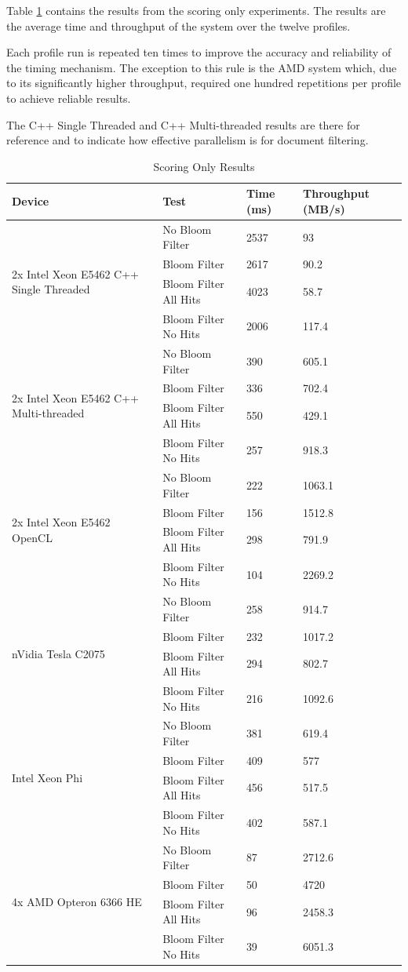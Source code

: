 Table \ref{table:scoringOnly} contains the results from the scoring only
experiments. The results are the average time and throughput of the system over
the twelve profiles.

Each profile run is repeated ten times to improve the accuracy and reliability
of the timing mechanism. The exception to this rule is the AMD system which,
due to its significantly higher throughput, required one hundred repetitions
per profile to achieve reliable results.

The C++ Single Threaded and C++ Multi-threaded results are there for reference
and to indicate how effective parallelism is for document filtering.

\begin{table}[H]
\begin{tabular}{|l|l|l|l|}
\hline
Device & Test & Time (ms) & Throughput (MB/s)\\
\hline
\multirow{4}{*}{2x Intel Xeon E5462 C++ Single Threaded}
& No Bloom Filter & 2537 & 93 \\
& Bloom Filter & 2617 & 90.2 \\
& Bloom Filter All Hits & 4023 & 58.7 \\
& Bloom Filter No Hits & 2006 & 117.4 \\
\hline
\multirow{4}{*}{2x Intel Xeon E5462 C++ Multi-threaded}
& No Bloom Filter & 390 & 605.1 \\
& Bloom Filter & 336 & 702.4 \\
& Bloom Filter All Hits & 550 & 429.1 \\
& Bloom Filter No Hits & 257 & 918.3 \\
\hline
\multirow{4}{*}{2x Intel Xeon E5462 OpenCL}
& No Bloom Filter & 222 & 1063.1 \\
& Bloom Filter & 156 & 1512.8 \\
& Bloom Filter All Hits & 298 & 791.9 \\
& Bloom Filter No Hits & 104 & 2269.2 \\
\hline
\multirow{4}{*}{nVidia Tesla C2075}
& No Bloom Filter & 258 & 914.7 \\
& Bloom Filter & 232 & 1017.2 \\
& Bloom Filter All Hits & 294 & 802.7 \\
& Bloom Filter No Hits & 216 & 1092.6 \\
\hline
\multirow{4}{*}{Intel Xeon Phi}
& No Bloom Filter & 381 & 619.4 \\
& Bloom Filter & 409 & 577 \\
& Bloom Filter All Hits & 456 & 517.5 \\
& Bloom Filter No Hits & 402 & 587.1 \\
\hline
\multirow{4}{*}{4x AMD Opteron 6366 HE}
& No Bloom Filter & 87 & 2712.6 \\
& Bloom Filter & 50 & 4720 \\
& Bloom Filter All Hits & 96 & 2458.3 \\
& Bloom Filter No Hits & 39 & 6051.3 \\
\hline
\end{tabular}
\caption{Scoring Only Results}
\label{table:scoringOnly}
\end{table}

